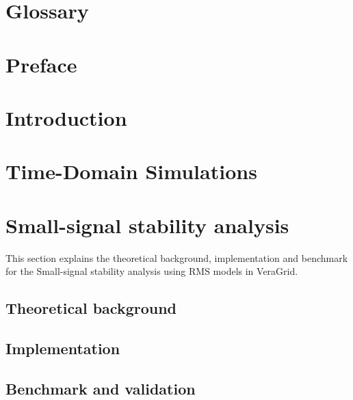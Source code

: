 \documentclass[a4paper, 11pt, titlepage, twoside]{article}
\begin{document}
\cleardoublepage

\tableofcontents

\newpage
\listoffigures

\newpage
\begingroup
\setlength{\parskip}{0pt}
\listoftables %
\endgroup

\setlength{\abovedisplayskip}{5pt} %
\setlength{\belowdisplayskip}{5pt} %

\newpage
\section*{Glossary}

\newpage

\section*{Preface}

\newpage

\section{Introduction}\label{Introduction}

\newpage

\section{Time-Domain Simulations}\label{dynamic}

\newpage

\section{Small-signal stability analysis}\label{SmallSignal}
This section explains the theoretical background, implementation and benchmark for the Small-signal stability analysis
using RMS models in VeraGrid.
\subsection{Theoretical background}

\subsection{Implementation}

\subsection{Benchmark and validation}

\newpage
\end{document}
